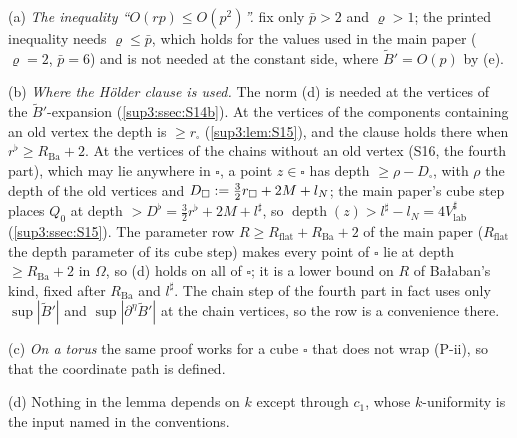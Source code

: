 \begin{remark}\label{sup3:rem:S13}
(a) \emph{The inequality ``$O(rp)\le O(p^2)$''.} \cite[(2.3), (2.7)]{Ba2} fix only $\bar p>2$ and $\varrho>1$; the printed inequality needs $\varrho\le\bar p$, which holds for the values used in the main paper ($\varrho=2$, $\bar p=6$) and is not needed at the constant side, where $\tilde B'=O(p)$ by (e).

(b) \emph{Where the H\"older clause is used.} The norm (d) is needed at the vertices of the $\tilde B'$-expansion (\cref{sup3:ssec:S14b}). At the vertices of the components containing an old vertex the depth is $\ge r_\square$ (\cref{sup3:lem:S15}), and the clause holds there when $r^\flat\ge R_{\mathrm{Ba}}+2$. At the vertices of the chains without an old vertex (S16, the fourth part), which may lie anywhere in $\square$, a point $z\in\square$ has depth $\ge\rho-D_\square$, with $\rho$ the depth of the old vertices and $D_\square:=\tfrac32r_\square+2M+l_N$; the main paper's cube step places $Q_0$ at depth $>D^\flat=\tfrac32r^\flat+2M+l^\sharp$, so $\operatorname{depth}(z)>l^\sharp-l_N=4V^\sharp_{\mathrm{lab}}$ (\cref{sup3:ssec:S15}). The parameter row $R\ge R_{\mathrm{flat}}+R_{\mathrm{Ba}}+2$ of the main paper ($R_{\mathrm{flat}}$ the depth parameter of its cube step) makes every point of $\square$ lie at depth $\ge R_{\mathrm{Ba}}+2$ in $\Omega$, so (d) holds on all of $\square$; it is a lower bound on $R$ of Ba{\l}aban's kind, fixed after $R_{\mathrm{Ba}}$ and $l^\sharp$. The chain step of the fourth part in fact uses only $\sup|\tilde B'|$ and $\sup|\partial^\eta\tilde B'|$ at the chain vertices, so the row is a convenience there.

(c) \emph{On a torus} the same proof works for a cube $\square$ that does not wrap (P-ii), so that the coordinate path is defined.

(d) Nothing in the lemma depends on $k$ except through $c_1$, whose $k$-uniformity is the input named in the conventions.
\end{remark}
